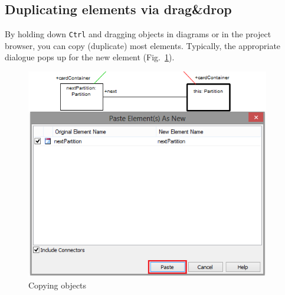 \newpage
\subsection{Duplicating elements via drag\&drop}

By holding down \texttt{Ctrl} and dragging objects in diagrams or in the project browser, you can copy (duplicate) most elements.
Typically, the appropriate dialogue pops up for the new element (Fig.~\ref{fig_copy01}).

\begin{figure}[htbp]
\begin{center}
  \includegraphics[width=0.95\textwidth]{copy1}
  \caption{Copying objects}  
  \label{fig_copy01}
\end{center}
\end{figure}